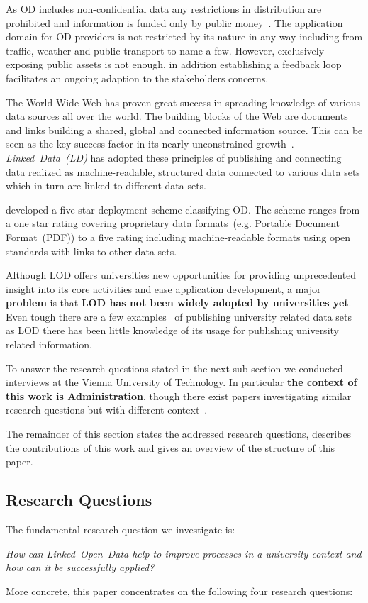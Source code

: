 \documentclass{article}
\begin{document}
As OD includes non-confidential data any restrictions in distribution are prohibited and information is funded only by public money~\cite{article:janssen2012benefits}. The application domain for OD providers is not restricted by its nature in any way including from traffic, weather and public transport to name a few. However, exclusively exposing public assets is not enough, in addition establishing a feedback loop facilitates an ongoing adaption to the stakeholders concerns. 

The World Wide Web has proven great success in spreading knowledge of various data sources all over the world. The building blocks of the Web are documents and links building a shared, global and connected information source. This can be seen as the key success factor in its nearly unconstrained growth~\cite{report:jacobs-i-2004--a}. 
\textit{Linked~Data~(LD)} has adopted these principles of publishing and connecting data realized as machine-readable, structured data connected to various data sets which in turn are linked to different data sets. 

\citet{artivle:bernerslee-t-2006-1} developed a five star deployment scheme classifying OD. The scheme ranges from a one star rating covering proprietary data formats~(e.g. Portable Document Format~(PDF)) to a five rating including machine-readable formats using open standards with links to other data sets.

Although LOD offers universities new opportunities for providing unprecedented insight into its core activities and ease application development, a major \textbf{problem} is that \textbf{LOD has not been widely adopted by universities yet}. Even tough there are a few examples~\cite{url:linked-universities-members} of publishing university related data sets as LOD there has been little knowledge of its usage for publishing university related information. 

To answer the research questions stated in the next sub-section we conducted interviews at the Vienna University of Technology. In particular \textbf{the context of this work is Administration}, though there exist papers investigating similar research questions but with different context~\cite{article:baronyai_publishing_2016, article:haller_publishing_2016}. 

The remainder of this section states the addressed research questions, describes the contributions of this work and gives an overview of the structure of this paper.

\subsection{Research Questions}
The fundamental research question we investigate is:
\begin{displayquote}
\textit{How can Linked~Open~Data help to improve processes in a university context and how can it be successfully applied?}
\end{displayquote}
More concrete, this paper concentrates on the following four research questions:
\end{document}
